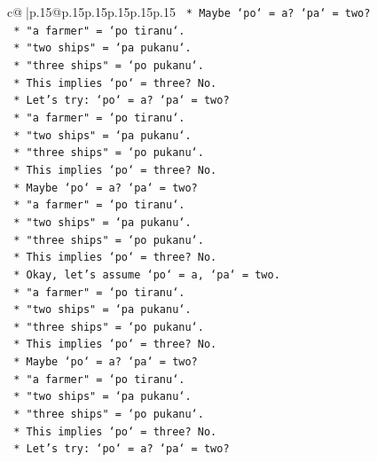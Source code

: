 \documentclass{article}
\begin{document}
{\begin{supertabular}{c@{$\;$}|p{.15\linewidth}@{}p{.15\linewidth}p{.15\linewidth}p{.15\linewidth}p{.15\linewidth}p{.15\linewidth}}
{{{\texttt{                *   Maybe `po` = a? `pa` = two?} \\
\texttt{                *   "a farmer" = `po tiranu`.} \\
\texttt{                *   "two ships" = `pa pukanu`.} \\
\texttt{                *   "three ships" = `po pukanu`.} \\
\texttt{                *   This implies `po` = three? No.} \\
\texttt{                *   Let's try: `po` = a? `pa` = two?} \\
\texttt{                *   "a farmer" = `po tiranu`.} \\
\texttt{                *   "two ships" = `pa pukanu`.} \\
\texttt{                *   "three ships" = `po pukanu`.} \\
\texttt{                *   This implies `po` = three? No.} \\
\texttt{                *   Maybe `po` = a? `pa` = two?} \\
\texttt{                *   "a farmer" = `po tiranu`.} \\
\texttt{                *   "two ships" = `pa pukanu`.} \\
\texttt{                *   "three ships" = `po pukanu`.} \\
\texttt{                *   This implies `po` = three? No.} \\
\texttt{                *   Okay, let's assume `po` = a, `pa` = two.} \\
\texttt{                *   "a farmer" = `po tiranu`.} \\
\texttt{                *   "two ships" = `pa pukanu`.} \\
\texttt{                *   "three ships" = `po pukanu`.} \\
\texttt{                *   This implies `po` = three? No.} \\
\texttt{                *   Maybe `po` = a? `pa` = two?} \\
\texttt{                *   "a farmer" = `po tiranu`.} \\
\texttt{                *   "two ships" = `pa pukanu`.} \\
\texttt{                *   "three ships" = `po pukanu`.} \\
\texttt{                *   This implies `po` = three? No.} \\
\texttt{                *   Let's try: `po` = a? `pa` = two?} \\
}}}
\end{supertabular}}
\end{document}
